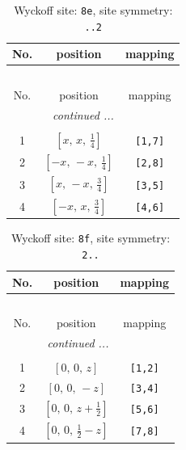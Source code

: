 \documentclass[fleqn,8pt]{jsarticle}
\begin{document}
\begin{longtable}{ccc}
\caption{Wyckoff site: {\tt 8e}, site symmetry: {\tt ..2}}
 \\
 \hline \hline
No. & position & mapping \\ \hline \endfirsthead

\multicolumn{2}{l}{\tablename\ \thetable{}} \\
 \hline \hline
No. & position & mapping \\ \hline \endhead

 \hline \hline
\multicolumn{2}{r}{\footnotesize\it continued ...} \\ \endfoot

 \hline \hline
\multicolumn{2}{r}{} \\ \endlastfoot

1 & $\left[ x,\, x,\, \frac{1}{4} \right]$ & {\tt [1,7]} \\ \hline
2 & $\left[ - x,\, - x,\, \frac{1}{4} \right]$ & {\tt [2,8]} \\ \hline
3 & $\left[ x,\, - x,\, \frac{3}{4} \right]$ & {\tt [3,5]} \\ \hline
4 & $\left[ - x,\, x,\, \frac{3}{4} \right]$ & {\tt [4,6]} \\
\end{longtable}
\renewcommand{\arraystretch}{1.2}
\begin{longtable}{ccc}
\caption{Wyckoff site: {\tt 8f}, site symmetry: {\tt 2..}}
 \\
 \hline \hline
No. & position & mapping \\ \hline \endfirsthead

\multicolumn{2}{l}{\tablename\ \thetable{}} \\
 \hline \hline
No. & position & mapping \\ \hline \endhead

 \hline \hline
\multicolumn{2}{r}{\footnotesize\it continued ...} \\ \endfoot

 \hline \hline
\multicolumn{2}{r}{} \\ \endlastfoot

1 & $\left[ 0,\, 0,\, z \right]$ & {\tt [1,2]} \\ \hline
2 & $\left[ 0,\, 0,\, - z \right]$ & {\tt [3,4]} \\ \hline
3 & $\left[ 0,\, 0,\, z + \frac{1}{2} \right]$ & {\tt [5,6]} \\ \hline
4 & $\left[ 0,\, 0,\, \frac{1}{2} - z \right]$ & {\tt [7,8]} \\
\end{longtable}
\end{document}
